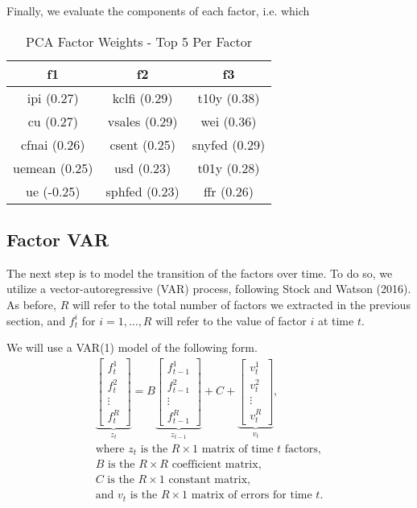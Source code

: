 \documentclass[11pt, letterpaper]{article}\usepackage[]{graphicx}\usepackage[]{color}
\begin{document}
Finally, we evaluate the components of each factor, i.e. which 
\begin{table}[H]
\centering
\begingroup\scriptsize
\begin{tabular}{ccc}
  \hline
f1 & f2 & f3 \\ 
  \hline
ipi (0.27) & kclfi (0.29) & t10y (0.38) \\ 
  cu (0.27) & vsales (0.29) & wei (0.36) \\ 
  cfnai (0.26) & csent (0.25) & snyfed (0.29) \\ 
  uemean (0.25) & usd (0.23) & t01y (0.28) \\ 
  ue (-0.25) & sphfed (0.23) & ffr (0.26) \\ 
   \hline
\end{tabular}
\endgroup
\caption{PCA Factor Weights - Top 5 Per Factor} 
\end{table}




\subsection{Factor VAR}
The next step is to model the transition of the factors over time. To do so, we utilize a vector-autoregressive (VAR) process, following Stock and Watson (2016). As before, $R$ will refer to the total number of factors we extracted in the previous section, and $f^i_t$ for $i = 1, \dots, R$ will refer to the value of factor $i$ at time $t$.

We will use a VAR(1) model of the following form.
\begin{align*}
\underbrace{\begin{bmatrix}
	f^1_{t}\\
	f^2_{t}\\
	\vdots \\
	f^R_{t}
\end{bmatrix}}_{z_t}
=
B
\underbrace{\begin{bmatrix}
	f^1_{t-1}\\
	f^2_{t-1}\\
	\vdots \\
	f^R_{t-1}
\end{bmatrix}}_{z_{t-1}}
+
C
+
\underbrace{\begin{bmatrix}
v^1_t\\
v^2_t\\
\vdots\\
v^R_t
\end{bmatrix}}_{v_t},\\
\text{where $z_t$ is the $R \times 1$ matrix of time $t$ factors,}\\
\text{$B$ is the $R \times R$ coefficient matrix,}\\
\text{$C$ is the $R \times 1$ constant matrix,}\\
\text{and $v_t$ is the $R \times 1$ matrix of errors for time $t$.}
\end{align*}
\end{document}
